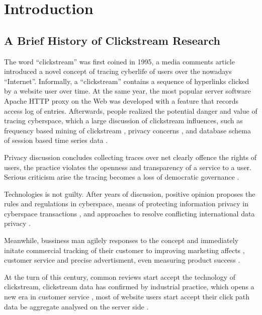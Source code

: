 \section{Introduction}
\label{ch:intro}

\subsection{A Brief History of Clickstream Research}


The word ``clickstream'' \cite{friedman1995} was first coined in 1995, a media comments 
article introduced a novel concept of tracing cyberlife of users over the nowadays 
``Internet''. Informally, a ``clickstream'' contains a sequence of hyperlinks clicked by a 
website user over time. At the same year, the most popular server software 
Apache HTTP \cite{apache1995http} proxy on the Web was developed with a feature that 
records access log of entries. Afterwards, people realized the potential danger and value 
of tracing cyberspace, which a large discussion of clickstream influences, such as 
frequency based mining of clickstream \cite{brodwin1995}, privacy concerns 
\cite{reidenberg1996governing}, and database schema of session based time series data 
\cite{courtheoux2000database}.


Privacy discussion concludes collecting traces over net clearly offence the rights of users,
the practice violates the openness and transparency of a service to a user.
Serious criticism arise the tracing becomes a loss of democratic governance \cite{gindin1997lost}.

Technologies is not guilty. After years of discussion, positive opinion proposes the rules 
\cite{reidenberg1996governing} and regulations \cite{skok1999establishing} in cyberspace,
means of protecting information privacy in cyberspace transactions \cite{kang1997information},
and approaches to resolve conflicting international data privacy \cite{reidenberg1999resolving}.

Meanwhile, bussiness man agilely responses to the concept and immediately initate 
commercial tracking of their customer to improving marketing affects \cite{novick1995}, 
customer service and precise advertisment\cite{reagle1999platform, bucklin2000sticky}, 
even measuring product success \cite{schonberg2000measuring}.

At the turn of this century, common reviews start accept the technology of clickstream,
clickstream data has confirmed by industrial practice, which opens a new era in 
customer service \cite{walsh2000internet}, most of website users start accept their click path data 
be aggregate analysed on the server side \cite{carr2000hypermediation}.

